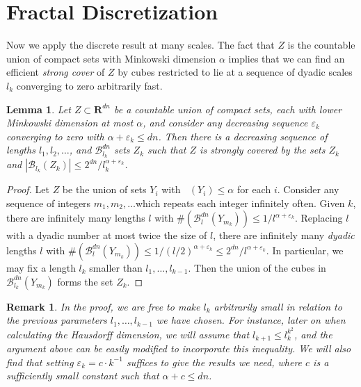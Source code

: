 \documentclass[usenames,dvipsnames]{article}
\theoremstyle{plain}
\newtheorem{lemma}{Lemma}
\theoremstyle{plain}
\newtheorem*{remark}{Remark}
\DeclareMathOperator{\lhdim}{\underline{\dim}_{\mathbf{M}}}
\begin{document}
\section{Fractal Discretization}

Now we apply the discrete result at many scales. The fact that $Z$ is the countable union of compact sets with Minkowski dimension $\alpha$ implies that we can find an efficient {\it strong cover} of $Z$ by cubes restricted to lie at a sequence of dyadic scales $l_k$ converging to zero arbitrarily fast.

\begin{lemma}
	Let $Z \subset \mathbf{R}^{dn}$ be a countable union of compact sets, each with lower Minkowski dimension at most $\alpha$, and consider any decreasing sequence $\varepsilon_k$ converging to zero with $\alpha + \varepsilon_k \leq dn$. Then there is a decreasing sequence of lengths $l_1, l_2, \dots$, and $\mathcal{B}^{dn}_{l_k}$ sets $Z_k$ such that $Z$ is strongly covered by the sets $Z_k$ and $|\mathcal{B}_{l_k}(Z_k)| \leq 2^{dn}/l_k^{\alpha + \varepsilon_k}$.
\end{lemma}
\begin{proof}
	Let $Z$ be the union of sets $Y_i$ with $\lhdim(Y_i) \leq \alpha$ for each $i$. Consider any sequence of integers $m_1, m_2, \dots$which repeats each integer infinitely often. Given $k$, there are infinitely many lengths $l$ with $\#(\mathcal{B}^{dn}_l(Y_{m_k})) \leq 1/l^{\alpha + \varepsilon_k}$. Replacing $l$ with a dyadic number at most twice the size of $l$, there are infinitely many {\it dyadic} lengths $l$ with $\# (\mathcal{B}^{dn}_l(Y_{m_k})) \leq 1/(l/2)^{\alpha + \varepsilon_k} \leq 2^{dn}/l^{\alpha + \varepsilon_k}$. In particular, we may fix a length $l_k$ smaller than $l_1, \dots, l_{k-1}$. Then the union of the cubes in $\mathcal{B}^{dn}_{l_k}(Y_{m_k})$ forms the set $Z_k$.
\end{proof}

\begin{remark}
	In the proof, we are free to make $l_k$ arbitrarily small in relation to the previous parameters $l_1, \dots, l_{k-1}$ we have chosen. For instance, later on when calculating the Hausdorff dimension, we will assume that $l_{k+1} \leq l_k^{k^2}$, and the argument above can be easily modified to incorporate this inequality. We will also find that setting $\varepsilon_k = c \cdot k^{-1}$ suffices to give the results we need, where $c$ is a sufficiently small constant such that $\alpha + c \leq dn$.
\end{remark}
\end{document}
